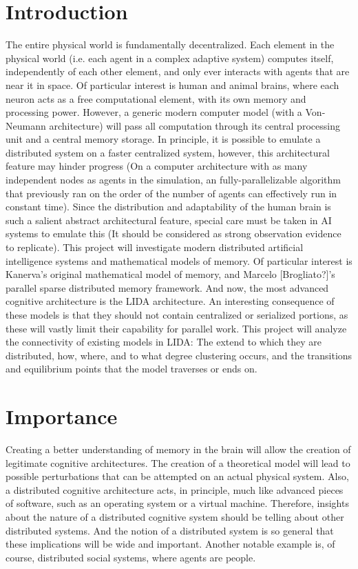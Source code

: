 \documentclass{nature}
\begin{document}
\section{Introduction}
    The entire physical world is fundamentally decentralized. 
    Each element in the physical world (i.e. each agent in a complex adaptive system) computes itself, independently of each other element, and only ever interacts with agents that are near it in space. 
    Of particular interest is human and animal brains, where each neuron acts as a free computational element, with its own memory and processing power.
    However, a generic modern computer model (with a Von-Neumann architecture) will pass all computation through its central processing unit and a central memory storage. 
    In principle, it is possible to emulate a distributed system on a faster centralized system, however, this architectural feature may hinder progress (On a computer architecture with as many independent nodes as agents in the simulation, an fully-parallelizable algorithm that previously ran on the order of the number of agents can effectively run in constant time). 
    Since the distribution and adaptability of the human brain is such a salient abstract architectural feature, special care must be taken in AI systems to emulate this (It should be considered as strong observation evidence to replicate).
    This project will investigate modern distributed artificial intelligence systems and mathematical models of memory. 
    Of particular interest is Kanerva's original mathematical model of memory, and Marcelo [Brogliato?]'s parallel sparse distributed memory framework. 
    And now, the most advanced cognitive architecture is the LIDA architecture. 
    An interesting consequence of these models is that they should not contain centralized or serialized portions, as these will vastly limit their capability for parallel work. 
    This project will analyze the connectivity of existing models in LIDA: The extend to which they are distributed, how, where, and to what degree clustering occurs, and the transitions and equilibrium points that the model traverses or ends on.

\section{Importance}

    Creating a better understanding of memory in the brain will allow the creation of legitimate cognitive architectures. 
    The creation of a theoretical model will lead to possible perturbations that can be attempted on an actual physical system.
    Also, a distributed cognitive architecture acts, in principle, much like advanced pieces of software, such as an operating system or a virtual machine.
    Therefore, insights about the nature of a distributed cognitive system should be telling about other distributed systems. 
    And the notion of a distributed system is so general that these implications will be wide and important.
    Another notable example is, of course, distributed social systems, where agents are people.
\end{document}
